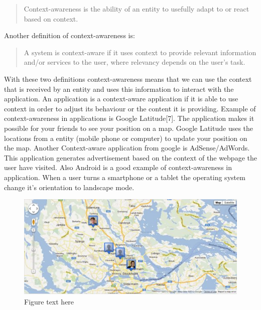 \begin{quotation}
Context-awareness is the ability of an entity to usefully adapt to or react based on context. 
\end{quotation}

Another definition of context-awareness is:

\begin{quotation}
A system is context-aware if it uses context to provide relevant information and\slash or services to the user, where relevancy depends on the user's task.
\end{quotation}

With these two definitions context-awareness means that we can use the context that is received by an entity and uses this information to interact with the application. An application is a context-aware application if it is able to use context in order to adjust its behaviour or the content it is providing. Example of context-awareness in applications is Google Latitude[7]. The application makes it possible for your friends to see your position on a map. Google Latitude uses the locations from a entity (mobile phone or computer) to update your position on the map. Another Context-aware application from google is AdSense\slash AdWords. This application generates advertisement based on the context of the webpage the user have visited. 
Also Android is a good example of context-awareness in application. When a user turns a smartphone or a tablet the operating system change 
it's orientation to landscape mode.

\begin{figure}[t]
	\centering
    	\includegraphics[scale=0.75]{part_2/context_awareness/latitude_pic.jpg}
		\caption{Figure text here} 
\end{figure}

